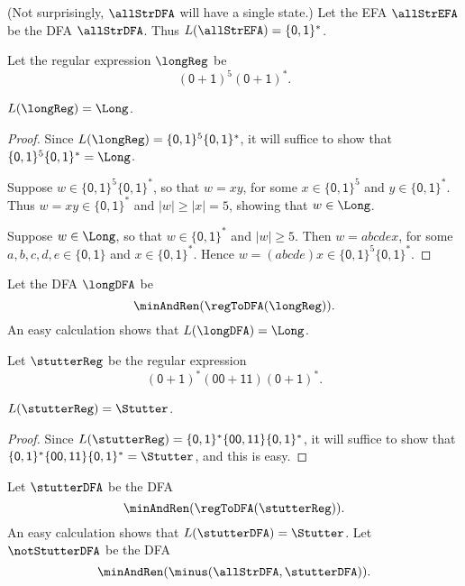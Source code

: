 (Not surprisingly, $\allStrDFA$ will have a single state.)
Let the EFA $\allStrEFA$ be the DFA $\allStrDFA$.  Thus
$L(\allStrEFA)=\{\mathsf{0,1}\}^*$.

Let the regular expression $\longReg$ be
\begin{displaymath}
(\mathsf{0+1})^5(\mathsf{0+1})^* .
\end{displaymath}

\begin{lemma}
\label{Stutter6}

$L(\longReg) = \Long$.
\end{lemma}

\begin{proof}
Since $L(\longReg)=\{\mathsf{0,1}\}^5\{\mathsf{0,1}\}^*$,
it will suffice to show that 
$\{\mathsf{0,1}\}^5\{\mathsf{0,1}\}^* = \Long$.

Suppose $w\in\{\mathsf{0,1}\}^5\{\mathsf{0,1}\}^*$, so that
$w=xy$, for some $x\in\{\mathsf{0,1}\}^5$ and $y\in
\{\mathsf{0,1}\}^*$.  Thus $w=xy\in\{\mathsf{0,1}\}^*$
and $|w|\geq|x|=5$, showing that $w\in\Long$.

Suppose $w\in\Long$, so that $w\in\{\mathsf{0,1}\}^*$ and
$|w|\geq 5$.  Then $w=abcdex$, for some $a,b,c,d,e\in\{\mathsf{0,1}\}$
and $x\in\{\mathsf{0,1}\}^*$.  Hence $w=(abcde)x\in
\{\mathsf{0,1}\}^5\{\mathsf{0,1}\}^*$.
\end{proof}

Let the DFA $\longDFA$ be
\begin{displaymath}
\minAndRen(\regToDFA(\longReg)) .
\end{displaymath}
An easy calculation shows that $L(\longDFA) = \Long$.

Let $\stutterReg$ be the regular expression
\begin{displaymath}
\mathsf{(0+1)^*(00+11)(0 + 1)^*} .
\end{displaymath}

\begin{lemma}
\label{Stutter7}
$L(\stutterReg) = \Stutter$.
\end{lemma}

\begin{proof}
Since $L(\stutterReg)=
\{\mathsf{0,1}\}^*\{\mathsf{00,11}\}\{\mathsf{0,1}\}^*$,
it will suffice to show that
$\{\mathsf{0,1}\}^*\{\mathsf{00,11}\}\{\mathsf{0,1}\}^* = \Stutter$,
and this is easy.
\end{proof}

Let $\stutterDFA$ be the DFA
\begin{displaymath}
\minAndRen(\regToDFA(\stutterReg)) .
\end{displaymath}
An easy calculation shows that $L(\stutterDFA) = \Stutter$.
Let $\notStutterDFA$ be the DFA
%
%
\begin{displaymath}
\minAndRen(\minus(\allStrDFA, \stutterDFA)) .
\end{displaymath}

